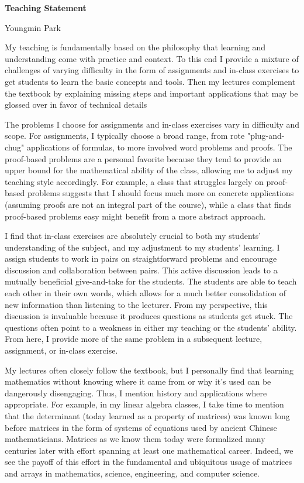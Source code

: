\documentclass[a4paper,11pt]{letter}
\begin{document}
\begin{center}
\Large \textbf{Teaching Statement}

\Large Youngmin Park
\end{center}

My teaching is fundamentally based on the philosophy that learning and understanding come with practice and context. To this end I provide a mixture of challenges of varying difficulty in the form of assignments and in-class exercises to get students to learn the basic concepts and tools. Then my lectures complement the textbook by explaining missing steps and important applications that may be glossed over in favor of technical details

The problems I choose for assignments and in-class exercises vary in difficulty and scope. For assignments, I typically choose a broad range, from rote "plug-and-chug" applications of formulas, to more involved word problems and proofs. The proof-based problems are a personal favorite because they tend to provide an upper bound for the mathematical ability of the class, allowing me to adjust my teaching style accordingly. For example, a class that struggles largely on proof-based problems suggests that I should focus much more on concrete applications (assuming proofs are not an integral part of the course), while a class that finds proof-based problems easy might benefit from a more abstract approach.

I find that in-class exercises are absolutely crucial to both my students' understanding of the subject, and my adjustment to my students' learning. I assign students to work in pairs on straightforward problems and encourage discussion and collaboration between pairs. This active discussion leads to a mutually beneficial give-and-take for the students. The students are able to teach each other in their own words, which allows for a much better consolidation of new information than listening to the lecturer. From my perspective, this discussion is invaluable because it produces questions as students get stuck. The questions often point to a weakness in either my teaching or the students' ability. From here, I provide more of the same problem in a subsequent lecture, assignment, or in-class exercise.

My lectures often closely follow the textbook, but I personally find that learning mathematics without knowing where it came from or why it's used can be dangerously disengaging. Thus, I mention history and applications where appropriate. For example, in my linear algebra classes, I take time to mention that the determinant (today learned as a property of matrices) was known long before matrices in the form of systems of equations used by ancient Chinese mathematicians. Matrices as we know them today were formalized many centuries later with effort spanning at least one mathematical career. Indeed, we see the payoff of this effort in the fundamental and ubiquitous usage of matrices and arrays in mathematics, science, engineering, and computer science.
\end{document}
